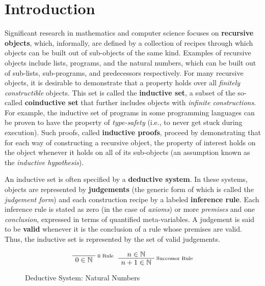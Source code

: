 \documentclass[titlepage]{article}
\newenvironment{bprooftree}
  {\leavevmode\hbox\bgroup}
  {\DisplayProof\egroup}
\begin{document}


\section{Introduction}

Significant research in mathematics and computer science focuses on \textbf{recursive objects}, which, informally, are defined by a collection of recipes through which objects can be built out of sub-objects of the same kind. Examples of recursive objects include lists, programs, and the natural numbers, which can be built out of sub-lists, sub-programs, and predecessors respectively. For many recursive objects, it is desirable to demonstrate that a property holds over all \textit{finitely constructible} objects. This set is called the \textbf{inductive set}, a subset of the so-called \textbf{coinductive set} that further includes objects with \textit{infinite constructions}. For example, the inductive set of programs in some programming languages can be proven to have the property of \textit{type-safety} (i.e., to never get stuck during execution). Such proofs, called \textbf{inductive proofs}, proceed by demonstrating that for each way of constructing a recursive object, the property of interest holds on the object whenever it holds on all of its sub-objects (an assumption known as the \textit{inductive hypothesis}). 

An inductive set is often specified by a \textbf{deductive system}. In these systems, objects are represented by \textbf{judgements} (the generic form of which is called the \textit{judgement form}) and each construction recipe by a labeled \textbf{inference rule}. Each inference rule is stated as zero (in the case of \textit{axioms}) or more \textit{premises} and one \textit{conclusion}, expressed in terms of quantified meta-variables. A judgement is said to be \textbf{valid} whenever it is the conclusion of a rule whose premises are valid. Thus, the inductive set is represented by the set of valid judgements.

\begin{figure}[h]
\caption{Deductive System: Natural Numbers}
\label{fig:nat-ded}

\begin{center}
\end{center}

\[
\begin{bprooftree}
\AxiomC{}
\RightLabel{\scriptsize 0 Rule}
\UnaryInfC{$0 \in \mathbb{N}$}
\end{bprooftree}
\begin{bprooftree}
\AxiomC{$n \in \mathbb{N}$}
\RightLabel{\scriptsize Successor Rule}
\UnaryInfC{$n+1 \in \mathbb{N}$}
\end{bprooftree}
\]
\end{figure}
\end{document}
